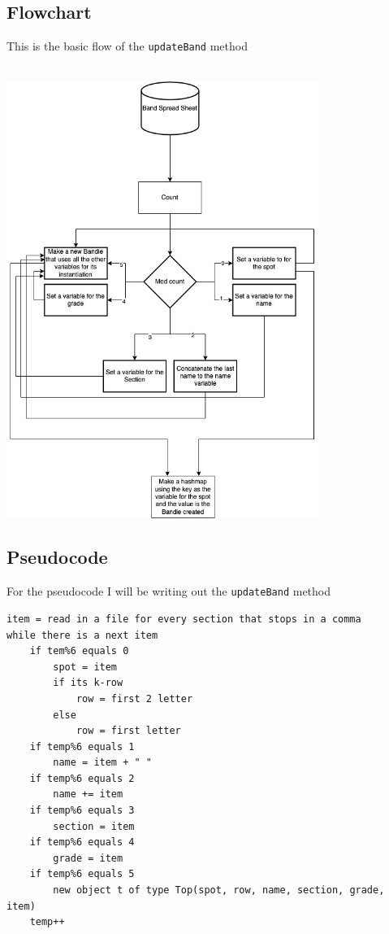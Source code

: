 \documentclass{article}
\begin{document}
\subsection{Flowchart}
This is the basic flow of the \verb|updateBand| method \\ \\
\begin{center}
	\includegraphics[width=4in]{IA UML and Flowchart-Flowchart.jpg}
\end{center}
\subsection{Pseudocode}
For the pseudocode I will be writing out the \verb|updateBand| method
\begin{verbatim}
item = read in a file for every section that stops in a comma
while there is a next item
	if tem%6 equals 0 
		spot = item
		if its k-row
			row = first 2 letter
		else
			row = first letter
	if temp%6 equals 1
		name = item + " "
	if temp%6 equals 2
		name += item
	if temp%6 equals 3
		section = item
	if temp%6 equals 4
		grade = item
	if temp%6 equals 5
		new object t of type Top(spot, row, name, section, grade, item)
	temp++
\end{verbatim}
\end{document}
